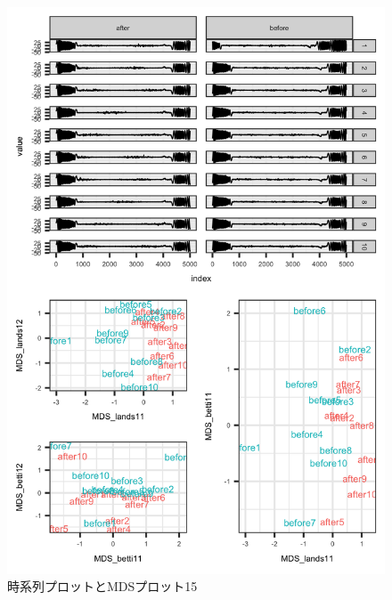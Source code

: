 \documentclass{jarticle}
\begin{document}
\begin{figure}[H]
	\begin{center}
		\includegraphics[width=15cm]{fig/MDS_plot15.png}
		\caption{時系列プロットとMDSプロット15}
		\label{fig:MDS_plot15}

	\end{center}
\end{figure}









\end{document}

